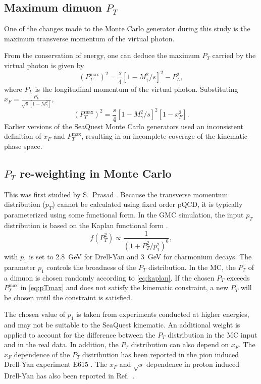 \documentclass[../main.tex]{subfiles}
\begin{document}

\subsection{Maximum dimuon \texorpdfstring{$P_T$}{P\_T}}
One of the changes made to the Monte Carlo generator during this study
is the maximum transverse momentum of the virtual photon.

From the conservation of energy, one can deduce the maximum $P_T$ carried by the virtual photon
is given by
\begin{equation}
	\left(P_T^{\mathrm{max}}\right)^2 = \frac{s}{4} \left[1-M^2_\gamma/s\right]^2 - P_L^2,
\end{equation}
where $P_L$ is the longitudinal momentum of the virtual photon.
Substituting $x_F = \frac{P_L}{\sqrt{s}\left[1-M^2_\gamma\right]}$,
\begin{equation}
	\left(P_T^{\mathrm{max}}\right)^2 = \frac{s}{4} \left[1-M^2_\gamma/s\right]^2\left[1-x_F^2\right].
	\label{eq:pTmax}
\end{equation}
Earlier versions of the SeaQuest Monte Carlo generators used an inconsistent definition of $x_F$
and $P_T^{\mathrm{max}}$, resulting in an incomplete coverage of the kinematic phase space.

\subsection{\texorpdfstring{$P_T$}{P\_T} re-weighting in Monte Carlo}
This was first studied by S.~Prasad \cite{prasad2020}.
Because the transverse momentum distribution ($p_T$) cannot be calculated using
fixed order pQCD, it is typically parameterized using some functional form.
In the GMC simulation, the input $p_T$ distribution is based on the
Kaplan functional form \cite{kaplan1978}.
\begin{equation}
	f\left(P_T^2\right) \propto \frac{1}{\left(1+ P_T^2/p_1^2\right)^6},
	\label{eq:kaplan}
\end{equation}
with $p_1$ is set to \SI{2.8}{\GeV} for Drell-Yan and \SI{3}{\GeV} for charmonium
decays. The parameter $p_1$ controls the broadness
of the $P_T$ distribution. In the MC, the $P_T$ of a dimuon is chosen randomly
according to \cref{eq:kaplan}. If the chosen $P_T$ exceeds $P_T^{\mathrm{max}}$ in \cref{eq:pTmax}
and does not satisfy the kinematic constraint, a new $P_T$ will be chosen until
the constraint is satisfied.

The chosen value of $p_1$ is taken from experiments conducted at higher
energies, and may not be suitable to the SeaQuest kinematic. An additional weight is
applied to account for the difference between the $P_T$ distribution in the MC input
and in the real data. In addition, the $P_T$ distribution can also depend on $x_F$.
The $x_F$ dependence of the $P_T$ distribution has been reported in the pion induced
Drell-Yan experiment E615 \cite{conway1989}. The $x_F$ and $\sqrt{s}$ dependence in
proton induced Drell-Yan has also been reported in Ref.~\cite{prasad2020}.
\end{document}
